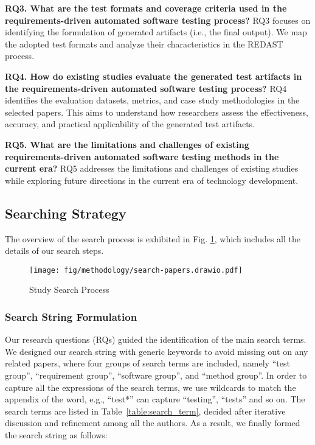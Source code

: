 \textbf{RQ3. What are the test formats and coverage criteria used in the requirements-driven automated software
testing process?} RQ3 focuses on identifying the formulation of generated artifacts (i.e., the final output). We map the adopted test formats and analyze their characteristics in the REDAST process.

\textbf{RQ4. How do existing studies evaluate the generated test artifacts in the requirements-driven automated software testing process?} RQ4 identifies the evaluation datasets, metrics, and case study methodologies in the selected papers. This aims to understand how researchers assess the effectiveness, accuracy, and practical applicability of the generated test artifacts.

\textbf{RQ5. What are the limitations and challenges of existing requirements-driven automated software testing methods in the current era?} RQ5 addresses the limitations and challenges of existing studies while exploring future directions in the current era of technology development. %

\subsection{Searching Strategy}

The overview of the search process is exhibited in Fig. \ref{fig:papers}, which includes all the details of our search steps.


\begin{figure}
    \centering
    \texttt{[image: fig/methodology/search-papers.drawio.pdf]}
    \caption{Study Search Process}
    \label{fig:papers}
\end{figure}

\subsubsection{Search String Formulation}
Our research questions (RQs) guided the identification of the main search terms. We designed our search string with generic keywords to avoid missing out on any related papers, where four groups of search terms are included, namely ``test group'', ``requirement group'', ``software group'', and ``method group''. In order to capture all the expressions of the search terms, we use wildcards to match the appendix of the word, e.g., ``test*'' can capture ``testing'', ``tests'' and so on. The search terms are listed in Table~\ref{table:search_term}, decided after iterative discussion and refinement among all the authors. As a result, we finally formed the search string as follows:


